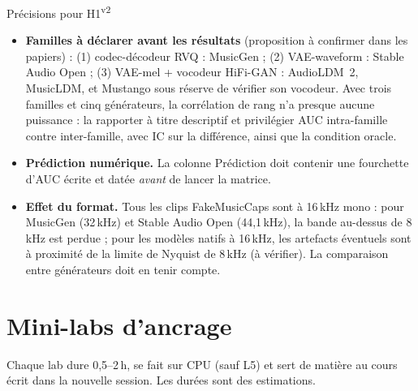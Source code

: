 \documentclass[11pt,a4paper]{article}
\providecommand{\og}{\guillemotleft\nobreakspace}%
\providecommand{\fg}{\nobreakspace\guillemotright}}
\newcommand{\vtwot}{\textsuperscript{v2}}  %
\begin{document}
\begin{corr}{Précisions pour H1\vtwot}
\begin{itemize}
\item \textbf{Familles à déclarer avant les résultats} (proposition à confirmer dans les papiers) : (1) codec-décodeur RVQ : MusicGen ; (2) VAE-waveform : Stable Audio Open ; (3) VAE-mel + vocodeur HiFi-GAN : AudioLDM~2, MusicLDM, et Mustango sous réserve de vérifier son vocodeur. Avec trois familles et cinq générateurs, la corrélation de rang n'a presque aucune puissance : la rapporter à titre descriptif et privilégier AUC intra-famille contre inter-famille, avec IC sur la différence, ainsi que la condition oracle.
\item \textbf{Prédiction numérique.} La colonne \og{}Prédiction\fg{} doit contenir une fourchette d'AUC écrite et datée \emph{avant} de lancer la matrice.
\item \textbf{Effet du format.} Tous les clips FakeMusicCaps sont à 16\,kHz mono : pour MusicGen (32\,kHz) et Stable Audio Open (44,1\,kHz), la bande au-dessus de 8\,kHz est perdue ; pour les modèles natifs à 16\,kHz, les artefacts éventuels sont à proximité de la limite de Nyquist de 8\,kHz (à vérifier). La comparaison entre générateurs doit en tenir compte.
\end{itemize}
\end{corr}
\section{Mini-labs d'ancrage}\label{sec:labs}

Chaque lab dure 0,5--2\,h, se fait sur CPU (sauf L5) et sert de matière au cours écrit dans la nouvelle session. Les durées sont des estimations.
\end{document}
